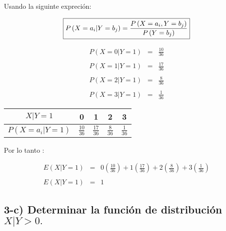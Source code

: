 \documentclass[12pt]{article}
\begin{document}
Usando la  siguinte expreci\'on:


\begin{equation*}
    \fbox{$
    \displaystyle P\left(X = a_i|Y = b_j\right)  =  \frac{P\left(X = a_i,Y = b_j\right)}{P\left(Y = b_j\right)}
    $}
\end{equation*}

\begin{equation*}
    \begin{array}{rcl}
        P\left(X = 0|Y = 1\right) & = & \displaystyle \frac{10}{36}
        \\
        \\
        P\left(X = 1|Y = 1\right) & = & \displaystyle \frac{17}{36}
        \\
        \\
        P\left(X = 2|Y = 1\right) & = & \displaystyle \frac{8}{36}
        \\
        \\
        P\left(X = 3|Y = 1\right) & = & \displaystyle \frac{1}{36}
    \end{array}
\end{equation*}


\begin{center}
    \renewcommand{\arraystretch}{1.5}
    \begin{tabular}{|c|c|c|c|c|}
        \hline
        $X|Y = 1$                      & 0               & 1               & 2              & 3
        \\
        \hline
        $P\left(X = a_i| Y = 1\right)$ & $\frac{10}{36}$ & $\frac{17}{36}$ & $\frac{8}{36}$ & $\frac{1}{36}$
        \\
        \hline
    \end{tabular}
\end{center}


Por lo tanto :

\begin{equation*}
    \begin{array}{rcl}
        E\left(X|Y = 1\right) & = & \displaystyle 0  \left(\frac{10}{36}\right) + 1 \left(\frac{17}{36} \right) + 2 \left(\frac{8}{36}\right)  + 3 \left( \frac{1}{36} \right)
        \\
        \\
        E\left(X|Y = 1\right) & = & 1
    \end{array}
\end{equation*}

\subsection*{3-c) Determinar la funci\'on de distribuci\'on $ X | Y > 0.$}
\end{document}
